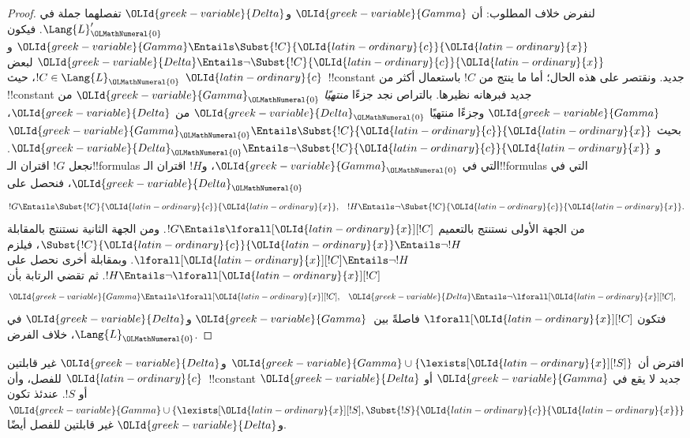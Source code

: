 \documentclass[../../../include/open-logic-section]{subfiles}
\begin{document}
\begin{proof}
لنفرض خلاف المطلوب: أن $\OLId{greek-variable}{Gamma}$ و$\OLId{greek-variable}{Delta}$ تفصلهما
جملة في $\Lang{L}'_\OLMathNumeral{0}$. فيكون
$\OLId{greek-variable}{Gamma} \Entails \Subst{!C}{\OLId{latin-ordinary}{c}}{\OLId{latin-ordinary}{x}}$ و
$\OLId{greek-variable}{Delta} \Entails \lnot \Subst{!C}{\OLId{latin-ordinary}{c}}{\OLId{latin-ordinary}{x}}$ لبعض
$!C \in \Lang{L}_\OLMathNumeral{0}$، حيث $\OLId{latin-ordinary}{c}$~!!{constant} جديد.
ونقتصر على هذه الحال؛ أما ما ينتج من $!C$ باستعمال أكثر
من !!{constant} جديد فبرهانه نظيرها.
بالتراص نجد جزءًا \emph{منتهيًا} $\OLId{greek-variable}{Gamma}_\OLMathNumeral{0}$ من $\OLId{greek-variable}{Gamma}$
وجزءًا منتهيًا $\OLId{greek-variable}{Delta}_\OLMathNumeral{0}$ من $\OLId{greek-variable}{Delta}$، بحيث
$\OLId{greek-variable}{Gamma}_\OLMathNumeral{0} \Entails \Subst{!C}{\OLId{latin-ordinary}{c}}{\OLId{latin-ordinary}{x}}$ و
$\OLId{greek-variable}{Delta}_\OLMathNumeral{0} \Entails \lnot \Subst{!C}{\OLId{latin-ordinary}{c}}{\OLId{latin-ordinary}{x}}$.
نجعل $!G$ اقتران الـ!!{formula}s التي في $\OLId{greek-variable}{Gamma}_\OLMathNumeral{0}$،
و$!H$ اقتران الـ!!{formula}s التي في $\OLId{greek-variable}{Delta}_\OLMathNumeral{0}$، فنحصل على
\begin{align*}
  !G & \Entails \Subst{!C}{\OLId{latin-ordinary}{c}}{\OLId{latin-ordinary}{x}}, & !H  \Entails \lnot \Subst{!C}{\OLId{latin-ordinary}{c}}{\OLId{latin-ordinary}{x}}.
\end{align*}
من الجهة الأولى نستنتج بالتعميم $!G \Entails \lforall[\OLId{latin-ordinary}{x}][!C]$.
ومن الجهة الثانية نستنتج بالمقابلة
$\Subst{!C}{\OLId{latin-ordinary}{c}}{\OLId{latin-ordinary}{x}} \Entails \lnot !H$، فيلزم
$\lforall[\OLId{latin-ordinary}{x}][!C] \Entails \lnot !H$.
وبمقابلة أخرى نحصل على $!H \Entails \lnot \lforall[\OLId{latin-ordinary}{x}][!C]$.
ثم تقضي الرتابة بأن
\begin{align*}
  \OLId{greek-variable}{Gamma} &\Entails \lforall[\OLId{latin-ordinary}{x}][!C], &
  \OLId{greek-variable}{Delta} & \Entails \lnot \lforall[\OLId{latin-ordinary}{x}][!C],
\end{align*}
فتكون $\lforall[\OLId{latin-ordinary}{x}][!C]$ فاصلةً بين~$\OLId{greek-variable}{Gamma}$ و$\OLId{greek-variable}{Delta}$ في $\Lang{L}_\OLMathNumeral{0}$، خلاف الفرض.
\end{proof}

\begin{lem}
افترض أن $\OLId{greek-variable}{Gamma} \cup \{ \lexists[\OLId{latin-ordinary}{x}][!S] \}$ و$\OLId{greek-variable}{Delta}$ غير قابلتين
للفصل، وأن $\OLId{latin-ordinary}{c}$~!!{constant} جديد لا يقع في $\OLId{greek-variable}{Gamma}$ أو $\OLId{greek-variable}{Delta}$ أو
$!S$. عندئذ تكون
$\OLId{greek-variable}{Gamma} \cup \{ \lexists[\OLId{latin-ordinary}{x}][!S], \Subst{!S}{\OLId{latin-ordinary}{c}}{\OLId{latin-ordinary}{x}} \}$ و$\OLId{greek-variable}{Delta}$
غير قابلتين للفصل أيضًا.
\end{lem}
\end{document}
